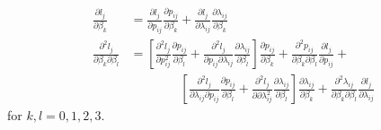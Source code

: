 \documentclass{article}\usepackage[]{graphicx}\usepackage[]{color}
\theoremstyle{plain}
\begin{document}
\begin{align*}
\frac{\partial l_j}{\partial \beta_k} &= \frac{\partial l_j}{\partial p_{ij}}\frac{\partial p_{ij}}{\partial \beta_k} + \frac{\partial l_j}{\partial \lambda_{ij}}\frac{\partial \lambda_{ij}}{\partial \beta_k} \\
\frac{\partial^2 l_j}{\partial \beta_k \partial \beta_l} &= \left[\frac{\partial^2 l_j}{\partial p_{ij}^2}\frac{\partial p_{ij}}{\partial \beta_l} + \frac{\partial^2 l_j}{\partial p_{ij}\partial \lambda_{ij}}\frac{\partial \lambda_{ij}}{\partial \beta_l}\right] \frac{\partial p_{ij}}{\partial \beta_k} + \frac{\partial^2 p_{ij}}{\partial \beta_k \partial \beta_l} \frac{\partial l_j}{\partial p_{ij}} + \\
& \qquad \qquad \left[\frac{\partial^2 l_j}{\partial \lambda_{ij} \partial p_{ij}}\frac{\partial p_{ij}}{\partial \beta_l} + \frac{\partial^2 l_j}{\partial \partial \lambda_{ij}^2}\frac{\partial \lambda_{ij}}{\partial \beta_l}\right] \frac{\partial \lambda_{ij}}{\partial \beta_k} + \frac{\partial^2 \lambda_{ij}}{\partial \beta_k \partial \beta_l} \frac{\partial l_j}{\partial \lambda_{ij}}
\end{align*}
for $k,l=0,1,2,3$.
\end{document}

